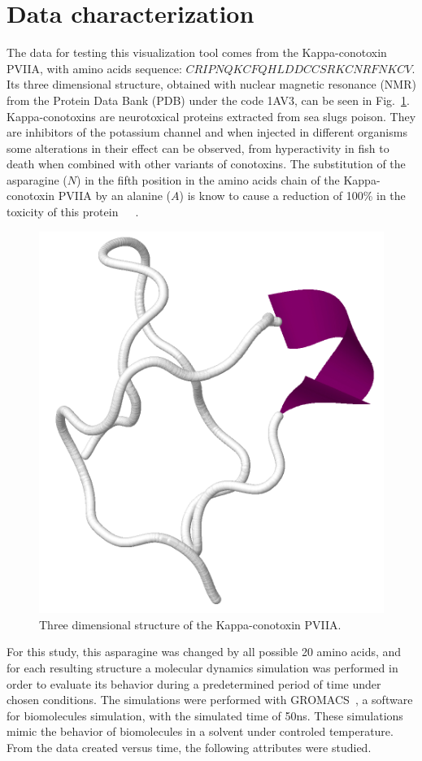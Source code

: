 \documentclass[10pt, conference]{IEEEtran}
\begin{document}
\section{Data characterization}

The data for testing this visualization tool comes from the Kappa-conotoxin PVIIA, with amino acids sequence: $CRIPNQKCFQHLDDCCSRKCNRFNKCV$. Its three dimensional structure, obtained with nuclear magnetic resonance (NMR) from the Protein Data Bank (PDB) under the code 1AV3, can be seen in Fig.~\ref{fig:pviia}. Kappa-conotoxins are neurotoxical proteins extracted from sea slugs poison. They are inhibitors of the potassium channel and when injected in different organisms some alterations in their effect can be observed, from hyperactivity in fish to death when combined with other variants of conotoxins. The substitution of the asparagine ($N$) in the fifth position in the amino acids chain of the Kappa-conotoxin PVIIA by an alanine ($A$) is know to cause a reduction of 100\% in the toxicity of this protein~\cite{jacobsen2000single}~\cite{mir2016conotoxins}~\cite{akey2002inherited}.

\begin{figure}
\includegraphics[width=0.7\linewidth]{figs/pviia.png}
\caption{Three dimensional structure of the Kappa-conotoxin PVIIA.} 
\label{fig:pviia}
\end{figure}

For this study, this asparagine was changed by all possible 20 amino acids, and for each resulting structure a molecular dynamics simulation was performed in order to evaluate its behavior during a predetermined period of time under chosen conditions. The simulations were performed with GROMACS~\cite{hess2008gromacs}, a software for biomolecules simulation, with the simulated time of 50ns. These simulations mimic the behavior of biomolecules in a solvent under controled temperature. From the data created versus time, the following attributes were studied.
\end{document}
